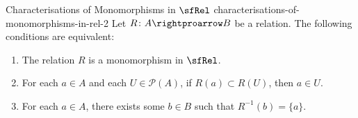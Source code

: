 \begin{proposition}{Characterisations of Monomorphisms in $\sfRel$ \rmII}{characterisations-of-monomorphisms-in-rel-2}%
    Let $R\colon A\rightproarrow B$ be a relation. The following conditions are equivalent:%
    \begin{enumerate}
        \item\label{characterisations-of-monomorphisms-in-rel-2-1}The relation $R$ is a monomorphism in $\sfRel$.
        \item\label{characterisations-of-monomorphisms-in-rel-2-2}For each $a\in A$ and each $U\in\mathcal{P}(A)$, if $R(a)\subset R(U)$, then $a\in U$.
        \item\label{characterisations-of-monomorphisms-in-rel-2-3}For each $a\in A$, there exists some $b\in B$ such that $R^{-1}(b)=\{a\}$.
    \end{enumerate}
\end{proposition}
